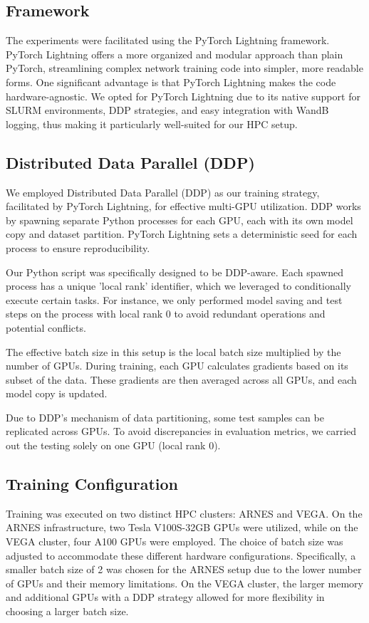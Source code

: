 \documentclass[a4paper,12pt,openright]{book}
\begin{document}
\subsection{Framework}

The experiments were facilitated using the PyTorch Lightning framework. PyTorch Lightning offers a more organized and modular approach than plain PyTorch, streamlining complex network training code into simpler, more readable forms. One significant advantage is that PyTorch Lightning makes the code hardware-agnostic. We opted for PyTorch Lightning due to its native support for SLURM environments, DDP strategies, and easy integration with WandB logging, thus making it particularly well-suited for our HPC setup.




\subsection{Distributed Data Parallel (DDP)}

We employed Distributed Data Parallel (DDP) as our training strategy, facilitated by PyTorch Lightning, for effective multi-GPU utilization. DDP works by spawning separate Python processes for each GPU, each with its own model copy and dataset partition. PyTorch Lightning sets a deterministic seed for each process to ensure reproducibility.

Our Python script was specifically designed to be DDP-aware. Each spawned process has a unique 'local rank' identifier, which we leveraged to conditionally execute certain tasks. For instance, we only performed model saving and test steps on the process with local rank 0 to avoid redundant operations and potential conflicts. 

The effective batch size in this setup is the local batch size multiplied by the number of GPUs. During training, each GPU calculates gradients based on its subset of the data. These gradients are then averaged across all GPUs, and each model copy is updated.

Due to DDP's mechanism of data partitioning, some test samples can be replicated across GPUs. To avoid discrepancies in evaluation metrics, we carried out the testing solely on one GPU (local rank 0).



\subsection{Training Configuration}
\label{training}
Training was executed on two distinct HPC clusters: ARNES and VEGA. On the ARNES infrastructure, two Tesla V100S-32GB GPUs were utilized, while on the VEGA cluster, four A100 GPUs were employed. The choice of batch size was adjusted to accommodate these different hardware configurations. Specifically, a smaller batch size of 2 was chosen for the ARNES setup due to the lower number of GPUs and their memory limitations. On the VEGA cluster, the larger memory and additional GPUs with a DDP strategy allowed for more flexibility in choosing a larger batch size.
\end{document}
